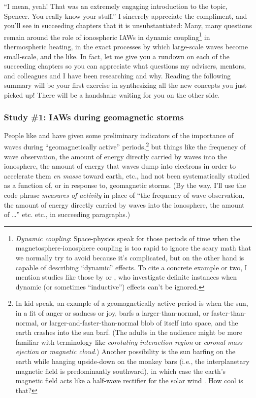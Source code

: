``I mean, yeah! That was an extremely engaging introduction to the topic,
Spencer. You really know your stuff.'' I sincerely appreciate the compliment,
and you'll see in succeeding chapters that it is unsubstantiated: Many, many
questions remain around the role of ionospheric IAWs in dynamic
coupling\footnote{\textit{Dynamic coupling}: Space-physics speak for those
  periods of time when the magnetosphere-ionosphere coupling is too rapid to
  ignore the scary math that we normally try to avoid because it's complicated,
  but on the other hand is capable of describing ``dynamic'' effects. To cite a
  concrete example or two, I mention studies like those by \citet{Mishin2015} or
  \citet{Verkhoglyadova2016}, who investigate definite instances when dynamic
  (or sometimes ``inductive'') effects can't be ignored.} in thermospheric
heating, in the exact processes by which large-scale waves become small-scale,
and the like. In fact, let me give you a rundown on each of the succeeding
chapters so you can appreciate what questions my advisers, mentors, and
colleagues and I have been researching and why. Reading the following summary
will be your first exercise in synthesizing all the new concepts you just picked
up! There will be a handshake waiting for you on the other side.

\subsubsection{Study \#1: IAWs during geomagnetic storms}

People like \citet{Chaston2007} and \citet{Newell2009} have given some
preliminary indicators of the importance of \Alf waves during ``geomagnetically
active'' periods,\footnote{In kid speak, an example of a geomagnetically active
  period is when the sun, in a fit of anger or sadness or joy, barfs a
  larger-than-normal, or faster-than-normal, or larger-and-faster-than-normal
  blob of itself into space, and the earth crashes into the sun barf. (The
  adults in the audience might be more familiar with terminology like
  \emph{corotating interaction region} or \emph{coronal mass ejection} or
  \emph{magnetic cloud}.) Another possibility is the sun barfing on the earth
  while hanging upside-down on the monkey bars (i.e., the interplanetary
  magnetic field is predominantly southward), in which case the earth's magnetic
  field acts like a half-wave rectifier for the solar wind \citep{Burton1975}. How
  cool is that?} but things like the frequency of \Alf wave observation, the
amount of energy directly carried by \Alf waves into the ionosphere, the amount
of energy that \Alf waves dump into electrons in order to accelerate them
\textit{en masse} toward earth, etc., had not been systematically studied as a
function of, or in response to, geomagnetic storms. (By the way, I'll use the
code phrase \emph{measures of \Alfic activity} in place of ``the frequency of
\Alf wave observation, the amount of energy directly carried by \Alf waves into
the ionosphere, the amount of \dots'' etc. etc., in succeeding paragraphs.)

